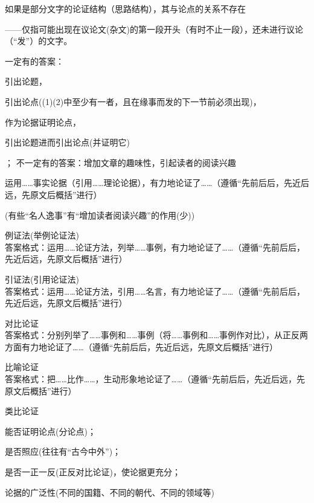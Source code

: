 如果是部分文字的论证结构（思路结构），其与论点的关系不存在

——仅指可能出现在议论文(杂文)的第一段开头（有时不止一段），还未进行议论（``发''）的文字。\par
一定有的答案：\begin{inparaenum}[(1)]\item 引出论题，\item 引出论点((1)(2)中至少有一者，且在缘事而发的下一节前必须出现)，\item 作为论据证明论点，\item 引出论题进而引出论点(并证明它)\end{inparaenum}；
不一定有的答案：增加文章的趣味性，引起读者的阅读兴趣

运用\ldots{}\ldots{}事实论据（引用\ldots{}\ldots{}理论论据），有力地论证了\ldots{}\ldots{}（遵循``先前后后，先近后远，先原文后概括''进行）

(有些``名人逸事''有``增加读者阅读兴趣''的作用(少))

\begin{asparaenum}[(1)]
\item 例证法(举例论证法)\\
答案格式：运用\ldots{}\ldots{}论证方法，列举\ldots{}\ldots{}事例，有力地论证了\ldots{}\ldots{}（遵循``先前后后，先近后远，先原文后概括''进行）
\item 引证法(引用论证法)\\
答案格式：运用\ldots{}\ldots{}论证方法，引用\ldots{}\ldots{}名言，有力地论证了\ldots{}\ldots{}（遵循``先前后后，先近后远，先原文后概括''进行）
\item 对比论证\\
答案格式：分别列举了\ldots{}\ldots{}事例和\ldots{}\ldots{}事例（将\ldots{}\ldots{}事例和\ldots{}\ldots{}事例作对比），从正反两方面有力地论证了\ldots{}\ldots{}（遵循``先前后后，先近后远，先原文后概括''进行）
\item 比喻论证\\
答案格式：把\ldots{}\ldots{}比作\ldots{}\ldots{}，生动形象地论证了\ldots{}\ldots{}（遵循``先前后后，先近后远，先原文后概括''进行）
\item 类比论证
\end{asparaenum}

\begin{asparaenum}[(1)]
\item 能否证明论点(分论点)；
\item 是否照应(往往有``古今中外'')；
\item 是否一正一反(正反对比论证)，使论据更充分；
\item 论据的广泛性(不同的国籍、不同的朝代、不同的领域等)
\end{asparaenum}

